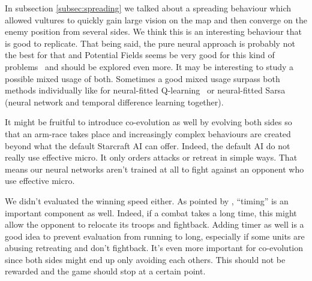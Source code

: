 In subsection \ref{subsec:spreading} we talked about a spreading behaviour which
allowed vultures to quickly gain large vision on the map and then converge on the enemy
position from several sides. We think this is an interesting behaviour that is good
to replicate. That being said, the pure neural approach is probably not the best for that and
Potential Fields seems be very good for this kind of problems~\cite{Hagelback08RTSPotentialFields, Svendsen12SCPotentialFieldsGP}
and should be explored even more. It may be interesting to study a possible mixed usage of both.
Sometimes a good mixed usage surpass both methods individually like for neural-fitted
Q-learning~\cite{Riedmiller05NeuralFittedQ} or neural-fitted Sarsa~\cite{Shantia11ConnectionistSC}
(neural network and temporal difference learning together).

It might be fruitful to introduce co-evolution as well by evolving
both sides so that an arm-race takes place and increasingly complex
behaviours are created beyond what the default Starcraft AI can offer.
Indeed, the default AI do not really use effective micro. It only
orders attacks or retreat in simple ways. That means our neural networks
aren't trained at all to fight against an opponent who use effective micro.

We didn't evaluated the winning speed either. As pointed by \citet{Liu14EffectiveMicro},
``timing'' is an important component as well. Indeed, if a combat takes a long time,
this might allow the opponent to relocate its troops and fightback.
Adding timer as well is a good idea to prevent evaluation from running to long,
especially if some units are abusing retreating and don't fightback. It's even more
important for co-evolution since both sides might end up only avoiding each others.
This should not be rewarded and the game should stop at a certain point.
